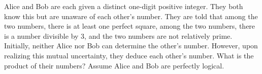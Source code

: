 Alice and Bob are each given a distinct one-digit positive integer. They both know this but are unaware of each other's number. They are told that among the two numbers, there is at least one perfect square, among the two numbers, there is a number divisible by $3$, and the two numbers are not relatively prime. Initially, neither Alice nor Bob can determine the other's number. However, upon realizing this mutual uncertainty, they deduce each other's number. What is the product of their numbers? Assume Alice and Bob are perfectly logical.
